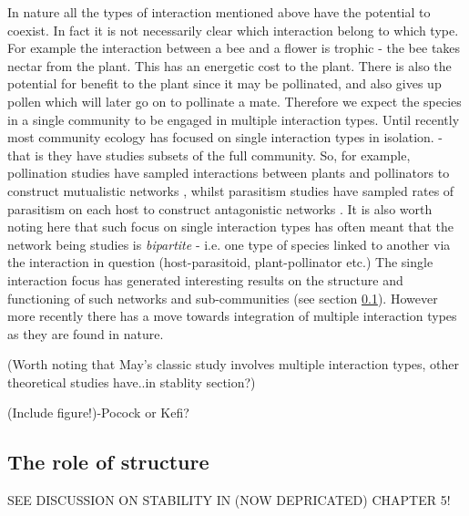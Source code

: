 In nature all the types of interaction mentioned above have the potential to coexist. In fact it is not necessarily clear which interaction belong to which type. For example the interaction between a bee and a flower is trophic - the bee takes nectar from the plant. This has an energetic cost to the plant. There is also the potential for benefit to the plant since it may be pollinated, and also gives up pollen which will later go on to pollinate a mate. Therefore we expect the species in a single community to be engaged in multiple interaction types. Until recently most community ecology has focused on single interaction types in isolation. - that is they have studies subsets of the full community. So, for example, pollination studies have sampled interactions between plants and pollinators to construct mutualistic networks \cite{gibson2011sampling}, whilst parasitism studies have sampled rates of parasitism on each host to construct antagonistic networks \cite{tylianakis2007habitat}. It is also worth noting here that such focus on single interaction types has often meant that the network being studies is \emph{bipartite} - i.e. one type of species linked to another via the interaction in question (host-parasitoid, plant-pollinator etc.) The single interaction focus has generated interesting results on the structure and functioning of such networks and sub-communities (see section \ref{sec:intro_role_of_sturcture}). However more recently there has a move towards integration of multiple interaction types as they are found in nature.        

(Worth noting that May's classic study involves multiple interaction types, other theoretical studies have..in stablity section?)

(Include figure!)-Pocock or Kefi?

\subsection{The role of structure}
\label{sec:intro_role_of_sturcture}

SEE DISCUSSION ON STABILITY IN (NOW DEPRICATED) CHAPTER 5!


